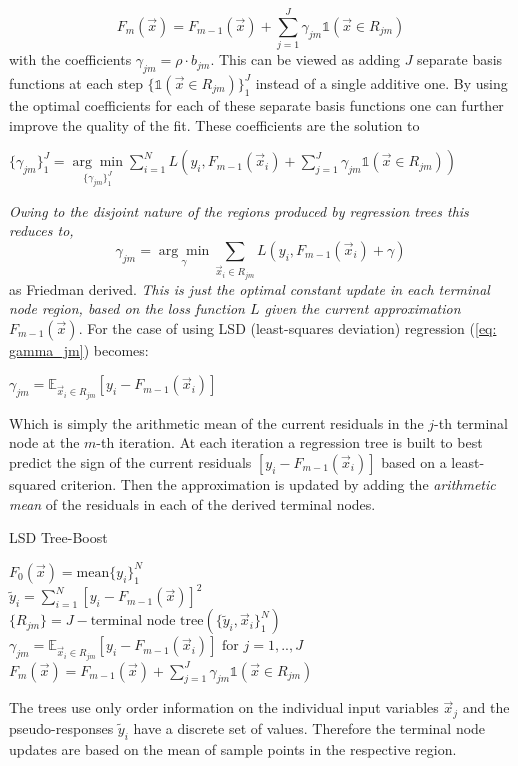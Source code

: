 \documentclass[12pt, a4paper]{article}
\begin{document}
\begin{equation}
        F_m(\vec{x}) = F_{m-1}(\vec{x}) + \sum_{j=1}^J \gamma_{jm} \mathds{1}(\vec{x} \in R_{jm})
\end{equation}
with the coefficients $\gamma_{jm} = \rho \cdot b_{jm}$. This can be viewed as adding $J$ separate basis functions at each step $\{\mathds{1}(\vec{x} \in R_{jm})\}_1^J$ instead of a single additive one. By using the optimal coefficients for each of these separate basis functions  one can further improve the quality of the fit.
These coefficients are the solution to
\begin{center}
    $\{\gamma_{jm}\}_1^J = \underset{\{\gamma_{jm}\}_1^J}{\arg\min} \sum_{i=1}^N L\left(y_i,F_{m-1}(\vec{x}_i) + \sum_{j=1}^J \gamma_{jm} \mathds{1}(\vec{x} \in R_{jm})\right)$
\end{center}
\textit{Owing to the disjoint nature of the regions produced by regression trees this reduces to,}
\begin{equation}
        \label{eq: gamma_jm}
        \gamma_{jm} = \underset{\gamma}{\arg\min} \sum_{\vec{x}_i \in R_{jm}} L\left(y_i,F_{m-1}(\vec{x}_i) + \gamma\right)
\end{equation}
as Friedman \cite{Friedman2001} derived. \textit{This is just the optimal constant update in each terminal node region, based on the loss function $L$ given the current approximation $F_{m-1}(\vec{x})$}. For the case of using LSD (least-squares deviation) regression (\ref{eq: gamma_jm}) becomes:
\begin{center}
    $\gamma_{jm} = \mathbb{E}_{\vec{x}_i \in R_{jm}}[y_i - F_{m-1}(\vec{x}_i)]$
\end{center}
Which is simply the arithmetic mean of the current residuals in the $j$-th terminal node at the $m$-th iteration. At each iteration a regression tree is built to best predict the sign of the current residuals $[y_i - F_{m-1}(\vec{x}_i)]$ based on a least-squared criterion. Then the approximation is updated by adding the \textit{arithmetic mean} of the residuals in each of the derived terminal nodes.
\\
\begin{algorithm}
\caption{LSD Tree-Boost}
\label{alg: lsd_tree_boost_algo}
    $F_0(\vec{x}) = \text{mean}\{y_i\}_1^N$ \\
    {
    $\tilde{y}_i = \sum_{i=1}^N [y_i - F_{m-1}(\vec{x})]^2$ \\
    $\{R_{jm}\} = J-\text{terminal node tree}(\{\tilde{y}_i,\vec{x}_i\}_1^N)$ \\
    $\gamma_{jm} = \mathbb{E}_{\vec{x}_i \in R_{jm}}[y_i - F_{m-1}(\vec{x}_i)] \text{ for } j = 1,..,J$ \\
    $F_m(\vec{x}) = F_{m-1}(\vec{x}) + \sum_{j=1}^J \gamma_{jm} \mathds{1}(\vec{x} \in R_{jm})$
    }
\end{algorithm}
The trees use only order information on the individual input variables $\vec{x}_j$ and the pseudo-responses $\tilde{y}_i$ have a discrete set of values. Therefore the terminal node updates are based on the mean of sample points in the respective region.
\end{document}
